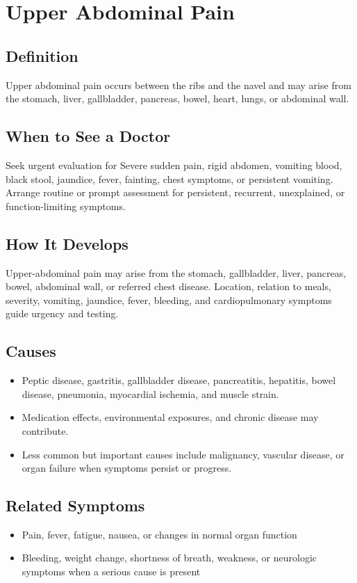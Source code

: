 \chapter{Upper Abdominal Pain}

\section*{Definition}
Upper abdominal pain occurs between the ribs and the navel and may arise from the stomach, liver, gallbladder, pancreas, bowel, heart, lungs, or abdominal wall.

\section*{When to See a Doctor}
Seek urgent evaluation for Severe sudden pain, rigid abdomen, vomiting blood, black stool, jaundice, fever, fainting, chest symptoms, or persistent vomiting. Arrange routine or prompt assessment for persistent, recurrent, unexplained, or function-limiting symptoms.

\section*{How It Develops}
Upper-abdominal pain may arise from the stomach, gallbladder, liver, pancreas, bowel, abdominal wall, or referred chest disease. Location, relation to meals, severity, vomiting, jaundice, fever, bleeding, and cardiopulmonary symptoms guide urgency and testing.

\section*{Causes}
\begin{itemize}
  \item Peptic disease, gastritis, gallbladder disease, pancreatitis, hepatitis, bowel disease, pneumonia, myocardial ischemia, and muscle strain.
  \item Medication effects, environmental exposures, and chronic disease may contribute.
  \item Less common but important causes include malignancy, vascular disease, or organ failure when symptoms persist or progress.
\end{itemize}

\section*{Related Symptoms}
\begin{itemize}
  \item Pain, fever, fatigue, nausea, or changes in normal organ function
  \item Bleeding, weight change, shortness of breath, weakness, or neurologic symptoms when a serious cause is present
\end{itemize}

